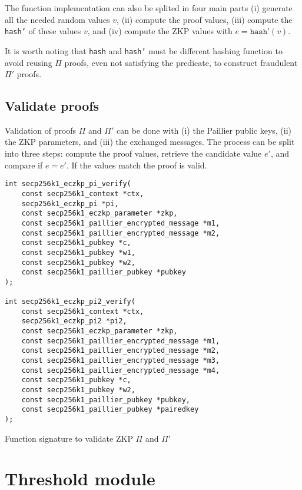 The function implementation can also be splited in four main parts (i) generate
all the needed random values $v$, (ii) compute the proof values, (iii) compute
the \texttt{hash'} of these values $v$, and (iv) compute the ZKP values with $e =
\texttt{hash'}(v)$.

It is worth noting that \texttt{hash} and \texttt{hash'} must be different
hashing function to avoid reusing $\Pi$ proofs, even not satisfying the
predicate, to construct fraudulent $\Pi'$ proofs.

\subsection{Validate proofs}

Validation of proofs $\Pi$ and $\Pi'$ can be done with (i) the Paillier public
keys, (ii) the ZKP parameters, and (iii) the exchanged messages. The process can
be split into three steps: compute the proof values, retrieve the candidate
value $e'$, and compare if $e = e'$. If the values match the proof is valid.

\begin{longlisting}
  \begin{verbatim}
int secp256k1_eczkp_pi_verify(
    const secp256k1_context *ctx,
    secp256k1_eczkp_pi *pi,
    const secp256k1_eczkp_parameter *zkp,
    const secp256k1_paillier_encrypted_message *m1,
    const secp256k1_paillier_encrypted_message *m2,
    const secp256k1_pubkey *c,
    const secp256k1_pubkey *w1,
    const secp256k1_pubkey *w2,
    const secp256k1_paillier_pubkey *pubkey
);

int secp256k1_eczkp_pi2_verify(
    const secp256k1_context *ctx,
    secp256k1_eczkp_pi2 *pi2,
    const secp256k1_eczkp_parameter *zkp,
    const secp256k1_paillier_encrypted_message *m1,
    const secp256k1_paillier_encrypted_message *m2,
    const secp256k1_paillier_encrypted_message *m3,
    const secp256k1_paillier_encrypted_message *m4,
    const secp256k1_pubkey *c,
    const secp256k1_pubkey *w2,
    const secp256k1_paillier_pubkey *pubkey,
    const secp256k1_paillier_pubkey *pairedkey
);
  \end{verbatim}
	\caption{Function signature to validate ZKP $\Pi$ and $\Pi'$}
	\label{lst:funcSigValidatePiPi2}
\end{longlisting}


\section{Threshold module}


